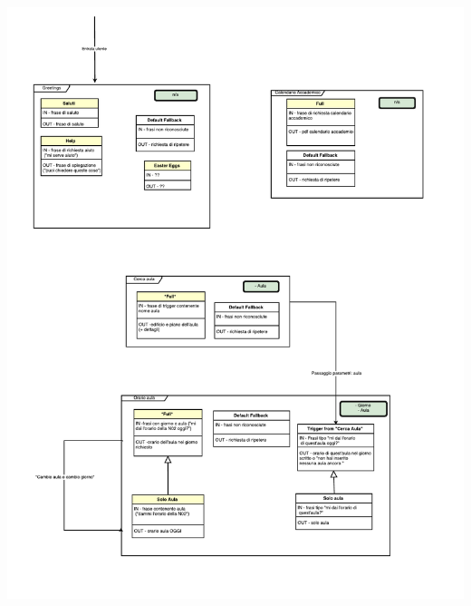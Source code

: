\documentclass[]{article}
\begin{document}
\vspace*{-3cm}
\hspace*{-3cm} 
\includegraphics[width=1.6\textwidth]{p05}
\thispagestyle{empty}
\end{document}
